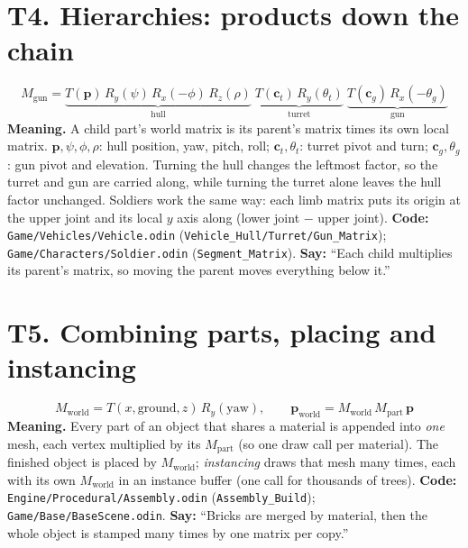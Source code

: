 \documentclass[11pt,a4paper]{article}
\newcommand{\code}[1]{{\small\texttt{#1}}}
\begin{document}
\section{T4. Hierarchies: products down the chain}
\[M_{\text{gun}}=\underbrace{T(\mathbf p)\,R_y(\psi)\,R_x(-\phi)\,R_z(\rho)}_{\text{hull}}\;\underbrace{T(\mathbf c_t)\,R_y(\theta_t)}_{\text{turret}}\;\underbrace{T(\mathbf c_g)\,R_x(-\theta_g)}_{\text{gun}}\]
\textbf{Meaning.} A child part's world matrix is its parent's matrix times its own local matrix. $\mathbf p,\psi,\phi,\rho$: hull position, yaw, pitch, roll; $\mathbf c_t,\theta_t$: turret pivot and turn; $\mathbf c_g,\theta_g$: gun pivot and elevation. Turning the hull changes the leftmost factor, so the turret and gun are carried along, while turning the turret alone leaves the hull factor unchanged. Soldiers work the same way: each limb matrix puts its origin at the upper joint and its local $y$ axis along (lower joint $-$ upper joint).
\textbf{Code:} \code{Game/Vehicles/Vehicle.odin} (\code{Vehicle\_Hull/Turret/Gun\_Matrix}); \code{Game/Characters/Soldier.odin} (\code{Segment\_Matrix}). \textbf{Say:} ``Each child multiplies its parent's matrix, so moving the parent moves everything below it.''

\section{T5. Combining parts, placing and instancing}
\[M_{\text{world}}=T(x,\text{ground},z)\,R_y(\text{yaw}),\qquad \mathbf p_{\text{world}}=M_{\text{world}}\,M_{\text{part}}\,\mathbf p\]
\textbf{Meaning.} Every part of an object that shares a material is appended into \emph{one} mesh, each vertex multiplied by its $M_{\text{part}}$ (so one draw call per material). The finished object is placed by $M_{\text{world}}$; \emph{instancing} draws that mesh many times, each with its own $M_{\text{world}}$ in an instance buffer (one call for thousands of trees).
\textbf{Code:} \code{Engine/Procedural/Assembly.odin} (\code{Assembly\_Build}); \code{Game/Base/BaseScene.odin}. \textbf{Say:} ``Bricks are merged by material, then the whole object is stamped many times by one matrix per copy.''
\end{document}
